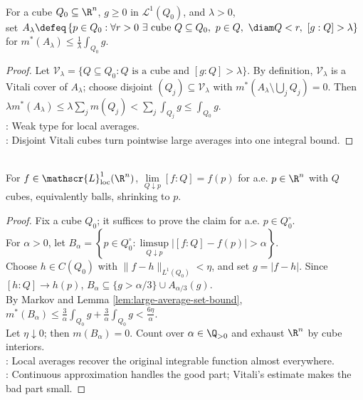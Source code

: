 \begin{lemma} \label{lem:large-average-set-bound} \\
For a cube $Q_0\subseteq\R^n$, $g\ge0$ in $\mathscr{L}^1(Q_0)$, and $\lambda>0$,\\
set $A_\lambda\defeq \left\{p\in Q_0:\forall r>0\ \exists\text{ cube }Q\subseteq Q_0,\ p\in Q,\ \diam Q<r,\ [g:Q]>\lambda\right\}$ for $m^\ast(A_\lambda)\leq \frac{1}{\lambda}\int_{Q_0} g$.
\begin{proof}
Let $\mathcal{V}_\lambda=\{Q\subseteq Q_0:Q\text{ is a cube and }[g:Q]>\lambda\}$. By definition, $\mathcal{V}_\lambda$ is a Vitali cover of $A_\lambda$; choose disjoint $(Q_j)\subseteq\mathcal{V}_\lambda$ with $m^\ast(A_\lambda\setminus\bigcup_jQ_j)=0$. Then $\lambda m^\ast(A_\lambda) \le \lambda\sum_jm(Q_j) <\sum_j\int_{Q_j}g \le\int_{Q_0}g$.\\
: Weak type for local averages.\\
: Disjoint Vitali cubes turn pointwise large averages into one integral bound.
\end{proof}
\end{lemma}

\begin{theorem} \label{thm:lebesgue-average-value-theorem} \\
For $f\in\mathscr{L}^1_{\mathrm{loc}}(\R^n)$, $\lim\limits_{Q\downarrow p}[f:Q]=f(p)$ for a.e. $p\in\R^n$ with $Q$ cubes, equivalently balls, shrinking to $p$.
\begin{proof}
Fix a cube $Q_0$; it suffices to prove the claim for a.e. $p\in Q_0^\circ$.\\
For $\alpha>0$, let $B_\alpha=\left\{p\in Q_0^\circ:\limsup\limits_{Q\downarrow p}|[f:Q]-f(p)|>\alpha\right\}$.\\
Choose $h\in C(Q_0)$ with $\|f-h\|_{L^1(Q_0)}<\eta$, and set $g=|f-h|$. Since $[h:Q]\to h(p)$, $B_\alpha\subseteq \{g>\alpha/3\}\cup A_{\alpha/3}(g)$.\\
By Markov and Lemma \ref{lem:large-average-set-bound}, $m^\ast(B_\alpha)\le \frac{3}{\alpha}\int_{Q_0}g+\frac{3}{\alpha}\int_{Q_0}g <\frac{6\eta}{\alpha}$.\\
Let $\eta\downarrow0$; then $m(B_\alpha)=0$. Count over $\alpha\in\Q_{>0}$ and exhaust $\R^n$ by cube interiors.\\
: Local averages recover the original integrable function almost everywhere.\\
: Continuous approximation handles the good part; Vitali's estimate makes the bad part small.
\end{proof}
\end{theorem}

